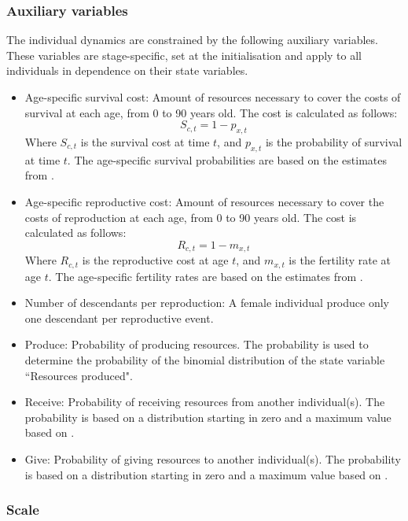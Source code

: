 \documentclass{article}
\begin{document}
\subsubsection{Auxiliary variables}

The individual dynamics are constrained by the following auxiliary variables. These variables are stage-specific, set at the initialisation and apply to all individuals in dependence on their state variables.

\begin{itemize}
    \item Age-specific survival cost: Amount of resources necessary to cover the costs of survival at each age, from 0 to 90 years old. The cost is calculated as follows:
\begin{equation}
S_{c,t}=1-p_{x,t}
\end{equation}
    Where $S_{c,t}$ is the survival cost at time $t$, and $p_{x,t}$ is the probability of survival at time $t$. The age-specific survival probabilities are based on the estimates from \cite{davison2021human}.
    \item Age-specific reproductive cost: Amount of resources necessary to cover the costs of reproduction at each age, from 0 to 90 years old. The cost is calculated as follows:
\begin{equation}
R_{c,t}=1-m_{x,t}    
\end{equation}
    Where $R_{c,t}$ is the reproductive cost at age $t$, and $m_{x,t}$ is the fertility rate at age $t$. The age-specific fertility rates are based on the estimates from \cite{davison2021human}.
    \item Number of descendants per reproduction: A female individual produce only one descendant per reproductive event.
    \item Produce: Probability of producing resources. The probability is used to determine the probability of the binomial distribution of the state variable ``Resources produced".
    \item Receive: Probability of receiving resources from another individual(s). The probability is based on a distribution starting in zero and a maximum value based on \cite{gurven2004give}.
    \item Give: Probability of giving resources to another individual(s). The probability is based on a distribution starting in zero and a maximum value based on \cite{gurven2004give}.
\end{itemize}

\subsubsection{Scale}
\end{document}
